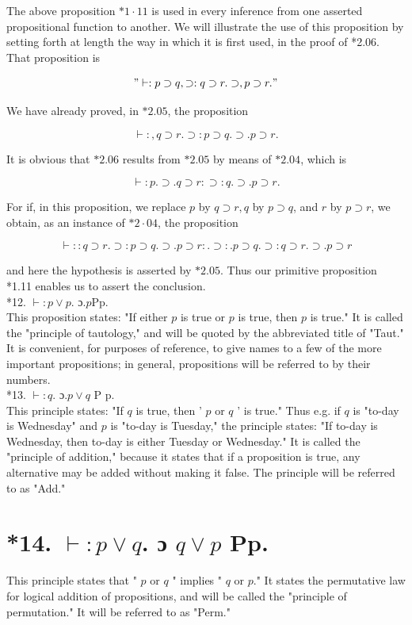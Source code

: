\documentclass[10pt]{article}
\begin{document}
The above proposition $* 1 \cdot 11$ is used in every inference from one asserted propositional function to another. We will illustrate the use of this proposition by setting forth at length the way in which it is first used, in the proof of *2.06. That proposition is

$$
" \vdash: p \supset q, \supset: q \supset r . \supset, p \supset r . "
$$

We have already proved, in $* 2.05$, the proposition

$$
\vdash:, q \supset r . \supset: p \supset q . \supset . p \supset r .
$$

It is obvious that $* 2.06$ results from $* 2.05$ by means of $* 2.04$, which is

$$
\vdash: p . \supset . q \supset r: \supset: q . \supset . p \supset r .
$$

For if, in this proposition, we replace $p$ by $q \supset r, q$ by $p \supset q$, and $r$ by $p \supset r$, we obtain, as an instance of $* 2 \cdot 04$, the proposition


\begin{equation*}
\vdash:: q \supset r . \supset: p \supset q . \supset . p \supset r: . \supset: . p \supset q . \supset: q \supset r . \supset . p \supset r \tag{1}
\end{equation*}


and here the hypothesis is asserted by $* 2.05$. Thus our primitive proposition *1.11 enables us to assert the conclusion.\\
*12. $\vdash: p \vee p$. ɔ.$p \mathrm{Pp}$.\\
This proposition states: "If either $p$ is true or $p$ is true, then $p$ is true." It is called the "principle of tautology," and will be quoted by the abbreviated title of "Taut." It is convenient, for purposes of reference, to give names to a few of the more important propositions; in general, propositions will be referred to by their numbers.\\
*13. $\vdash: q$. ɔ.$p \vee q$ P p.\\
This principle states: "If $q$ is true, then ' $p$ or $q$ ' is true." Thus e.g. if $q$ is "to-day is Wednesday" and $p$ is "to-day is Tuesday," the principle states: "If to-day is Wednesday, then to-day is either Tuesday or Wednesday." It is called the "principle of addition," because it states that if a proposition is true, any alternative may be added without making it false. The principle will be referred to as "Add."

\section*{*14. $\vdash: p \vee q$. ɔ $q \vee p$ Pp.}
This principle states that " $p$ or $q$ " implies " $q$ or $p$." It states the permutative law for logical addition of propositions, and will be called the "principle of permutation." It will be referred to as "Perm."
\end{document}
